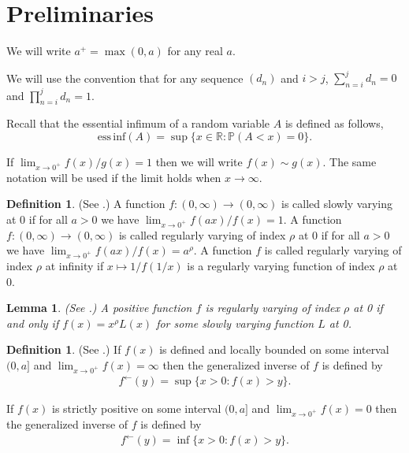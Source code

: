 \documentclass[bj]{imsart}
\numberwithin{equation}{section}
\renewcommand{\P}{\mathbb{P}}
\newcommand{\essinf}{\mathrm{ess\,inf}}
\newcommand{\R}{\mathbb{R}}
\newcommand{\1}{\mathbf{1}}
\newcommand{\la}{\leftarrow}
\newtheorem{lemma}[thm]{Lemma}
\theoremstyle{definition}
\newtheorem{defin}[thm]{Definition}
\begin{document}
\section{Preliminaries}

We will  write $a^+ = \max(0,a)$ for any real $a$.

We will use the convention that for any sequence $(d_n)$ and $i>j$, $\sum_{n=i}^{j} d_n = 0$ and $\prod_{n=i}^{j} d_n = 1$.

Recall that the essential infimum of a random variable $A$ is defined as follows,
\begin{equation}\label{n8.1}
 \essinf(A)=  \sup\{x\in \R : \P(A< x)=0\} .
\end{equation}

If $\lim_{x\to 0^+} f(x)/g(x) =1$ then we will write $f(x)\sim g(x)$. The same notation will be used if the limit holds when $x\to \infty$.

\begin{defin} (See \cite[(1.2.1),  Sects. 1.4.1-1.4.2]{regularVariation}.)
A function $f:(0,\infty)\to (0,\infty)$ is called  slowly varying at 0 if for all $a>0$ we have 
$\lim_{x\to0^+} f(ax)/f(x) =1$. A function $f:(0,\infty)\to (0,\infty)$ is called  regularly varying  of index $\rho$ at 0 if for all $a>0$ we have 
$\lim_{x\to0^+} f(ax)/f(x) =a^\rho$.
A function $f$ is called regularly varying of index $\rho$ at infinity if $x\mapsto 1/f(1/x)$ is a regularly varying function of index $\rho$ at $0$.
\end{defin}

\begin{lemma} (See \cite[(1.2.1),  Thm 1.4.1]{regularVariation}.)
 A positive function $f$ is regularly varying  of index $\rho$ at 0 if and only if $f(x) = x^\rho L(x)$ for some  slowly varying function $L$ at 0.
\end{lemma}


\begin{defin} \label{n3.4}
(See \cite[(1.5.10)]{regularVariation}.)
If $f(x)$ is defined and locally bounded on some interval $(0,a]$ and $\lim_{x\to 0^+} f(x) = \infty$ then the generalized inverse of $f$ is defined by
\begin{align*}
f^\la(y) = \sup\{x>0: f(x) > y\}.
\end{align*}

If $f(x)$ is strictly positive on some interval $(0,a]$ and $\lim_{x\to 0^+} f(x) = 0$ then the generalized inverse of $f$ is defined by
\begin{align*}
f^\la(y) = \inf\{x>0: f(x) > y\}.
\end{align*}

\end{defin}
\end{document}
